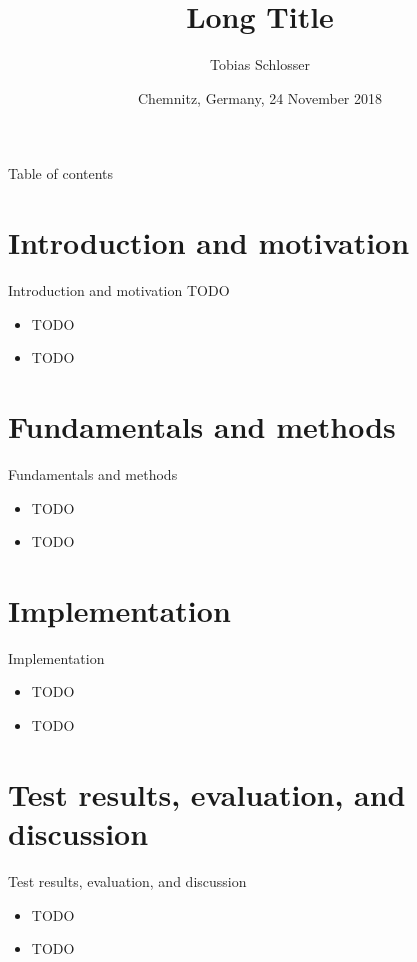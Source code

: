 \documentclass[xcolor=dvipsnames]{beamer}
\title[Short Title]{\normalsize Long Title}
\author[T. Schlosser]{\footnotesize Tobias Schlosser}
\institute{%
	Junior Professorship of Media Computing, \\
	Chemnitz University of Technology, 09107 Chemnitz, Germany, \\
	\texttt{\tiny \{firstname.lastname\}@cs.tu-chemnitz.de}
}
\date{\footnotesize Chemnitz, Germany, 24 November 2018}
\begin{document}
\begin{frame}
	\titlepage
\end{frame}

\begin{frame}{Table of contents}
	\tableofcontents[hideallsubsections]
\end{frame}




\section{Introduction and motivation}

\begin{frame}{Introduction and motivation}
	TODO \cite{Middleton2005}

	\begin{itemize}
		\item TODO
		\item TODO
	\end{itemize}
\end{frame}


\section{Fundamentals and methods}

\begin{frame}{Fundamentals and methods}
	\begin{itemize}
		\item TODO
		\item TODO
	\end{itemize}
\end{frame}


\section{Implementation}

\begin{frame}{Implementation}
	\begin{itemize}
		\item TODO
		\item TODO
	\end{itemize}
\end{frame}


\section{Test results, evaluation, and discussion}

\begin{frame}{Test results, evaluation, and discussion}
	\begin{itemize}
		\item TODO
		\item TODO
	\end{itemize}
\end{frame}
\end{document}
